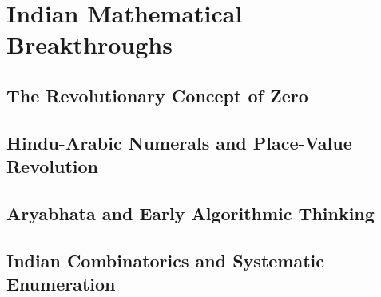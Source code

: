 
\chapter{Indian Mathematical Breakthroughs}

\section{The Revolutionary Concept of Zero}

\section{Hindu-Arabic Numerals and Place-Value Revolution}

\section{Aryabhata and Early Algorithmic Thinking}

\section{Indian Combinatorics and Systematic Enumeration}
